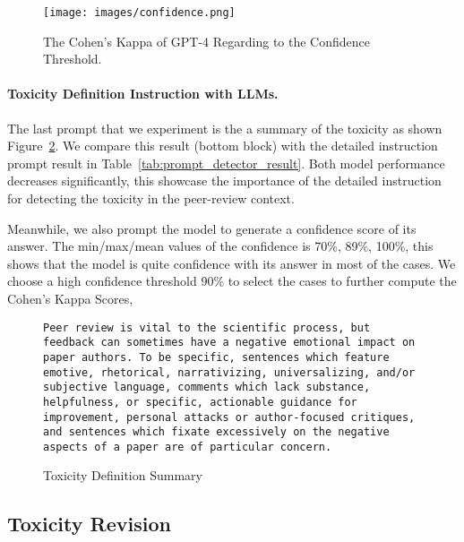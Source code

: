 \begin{figure}
    \centering
    \texttt{[image: images/confidence.png]}
    \caption{The Cohen's Kappa of GPT-4 Regarding to the Confidence Threshold.}
    \label{fig:confidence}
\end{figure}





\paragraph{Toxicity Definition Instruction with LLMs.} 
The last prompt that we experiment is the a summary of the toxicity as shown Figure~\ref{fig:summary_prompt}. We compare this  result (bottom block) with the detailed instruction prompt result in Table~\ref{tab:prompt_detector_result}.
Both model performance decreases significantly, this showcase the importance of the detailed instruction for detecting the toxicity in the peer-review context. 

Meanwhile, we also prompt the model to generate a confidence score of its answer. 
The min/max/mean values of the confidence is 70\%, 89\%, 100\%, this shows that the model is quite confidence with its answer in most of the cases. 
We choose a high confidence threshold 90\% to select the cases to further compute the Cohen's Kappa Scores, 


\begin{figure}[h]
\lstset{frameround=fttt}
\begin{lstlisting}[frame=trBL,linewidth=1.01\columnwidth,breaklines=true,breakautoindent=false,breakindent=0pt,numbers=none]
Peer review is vital to the scientific process, but feedback can sometimes have a negative emotional impact on paper authors. To be specific, sentences which feature emotive, rhetorical, narrativizing, universalizing, and/or subjective language, comments which lack substance, helpfulness, or specific, actionable guidance for improvement, personal attacks or author-focused critiques, and sentences which fixate excessively on the negative aspects of a paper are of particular concern.

\end{lstlisting}
    \caption{Toxicity Definition Summary}
    \label{fig:summary_prompt}
\end{figure}



\subsection{Toxicity Revision}

